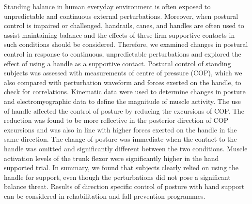 \renewcommand{\thesection}{\arabic{section}}  
\renewcommand{\thetable}{\arabic{table}}  
\renewcommand{\thefigure}{\arabic{figure}} 
\renewcommand{\theequation}{\arabic{equation}} 


Standing balance in human everyday environment is often exposed to
unpredictable and continuous external perturbations.  Moreover, when postural
control is impaired or challenged, handrails, canes, and handles are often
used to assist maintaining balance and the effects of these firm supportive
contacts in such conditions should be considered.  Therefore, we examined
changes in postural control in response to continuous, unpredictable
perturbations and explored the effect of using a handle as a supportive
contact.  Postural control of standing subjects was assessed with measurements
of centre of pressure (COP), which we also compared with perturbation waveform
and forces exerted on the handle, to check for correlations.  Kinematic data
were used to determine changes in posture and electromyographic data to define
the magnitude of muscle activity.  The use of handle affected the control of
posture by reducing the excursions of COP.  The reduction was found to be more
reflective in the posterior direction of COP excursions and was also in line
with higher forces exerted on the handle in the same direction.  The change of
posture was immediate when the contact to the handle was omitted and
significantly different between the two conditions.  Muscle activation levels
of the trunk flexor were significantly higher in the hand supported trial.  In
summary, we found that subjects clearly relied on using the handle for
support, even though the perturbations did not pose a significant balance
threat.  Results of direction specific control of posture with hand support
can be considered in rehabilitation and fall prevention programmes.


